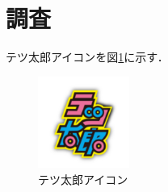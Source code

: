 \section{調査}

テツ太郎アイコンを図\ref{fig:tetsutaro}に示す．

\begin{figure}[tb]
  \centering
  \includegraphics[clip,width=3cm]{assets/tetsutaro.png}
  \caption{テツ太郎アイコン}
  \label{fig:tetsutaro}
\end{figure}